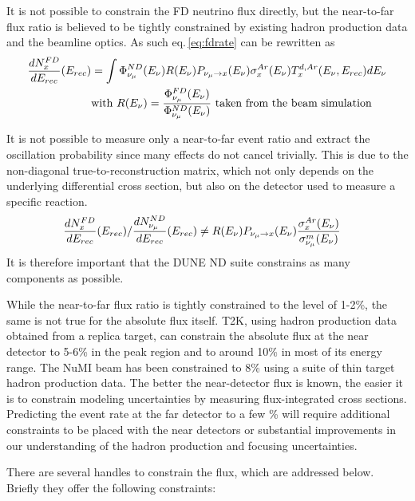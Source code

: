 It is not possible to constrain the FD neutrino flux directly, but the near-to-far flux ratio is believed to be tightly constrained by existing hadron production data and the beamline optics. As such eq.\,\ref{eq:fdrate} can be rewritten as 
\begin{align*}
\frac{dN^{FD}_{x}}{dE_{rec}}(E_{rec}) & = 
\int \Phi^{ND}_{\nu_\mu}(E_\nu)R(E_\nu)P_{\nu_\mu\rightarrow x}(E_\nu)\sigma^{Ar}_x(E_\nu)T^{d,Ar}_x(E_\nu,E_{rec})dE_\nu\\
& \mbox{with } R(E_\nu) = \frac{\Phi^{FD}_{\nu_\mu}(E_\nu)}{\Phi^{ND}_{\nu_\mu}(E_\nu)} \mbox{ taken from the beam simulation} \nonumber
\end{align*}

It is not possible to measure only a near-to-far event ratio and extract the oscillation probability since many effects do not cancel trivially.  This is due to the non-diagonal true-to-reconstruction matrix, which not only depends on the underlying differential cross section, but also on the detector used to measure a specific reaction.
\begin{align*}
\frac{dN^{FD}_{x}}{dE_{rec}}(E_{rec})/{\frac{dN^{ND}_{\nu_\mu}}{dE_{rec}}(E_{rec})} & \neq  R(E_\nu)P_{\nu_\mu\rightarrow x}(E_\nu)\frac{\sigma^{Ar}_x(E_\nu)}{\sigma^{m}_{\nu_\mu}(E_\nu)}
\end{align*}
It is therefore important that the DUNE ND suite constrains as many components as possible.


While the near-to-far flux ratio is tightly constrained to the level of 1-2\%, the same is not true for the absolute flux itself. T2K, using hadron production data obtained from a replica target, can constrain the absolute flux at the near detector to 5-6\% in the peak region and to around 10\% in most of its energy range. The NuMI beam has been constrained to 8\% using a suite of thin target hadron production data. The better the near-detector flux is known, the easier it is to constrain modeling uncertainties by measuring flux-integrated cross sections. Predicting the event rate at the far detector to a few \% will require additional constraints to be placed with the near detectors or substantial improvements in our understanding of the hadron production and focusing uncertainties. 

There are several handles to constrain the flux, which are addressed below. Briefly they offer the following constraints:


